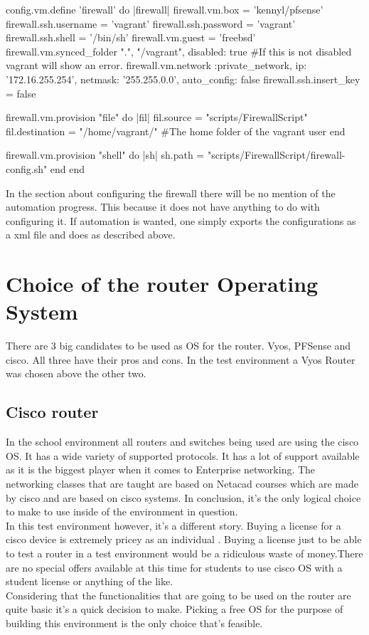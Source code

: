 \begin{cisco}[title=PFSense automation in the vagrantfile]
  config.vm.define 'firewall' do |firewall|
    firewall.vm.box = 'kennyl/pfsense'
    firewall.ssh.username = 'vagrant'
    firewall.ssh.password = 'vagrant'
    firewall.ssh.shell = '/bin/sh'
    firewall.vm.guest = 'freebsd'
    firewall.vm.synced_folder ".", "/vagrant", disabled: true #If this is not disabled vagrant will show an error.
    firewall.vm.network :private_network,
      ip: '172.16.255.254',
      netmask: '255.255.0.0',
      auto_config: false
    firewall.ssh.insert_key = false

    firewall.vm.provision "file" do |fil|
      fil.source = "scripts/FirewallScript"
      fil.destination = "/home/vagrant/" #The home folder of the vagrant user
    end

    firewall.vm.provision "shell" do |sh|
      sh.path = "scripts/FirewallScript/firewall-config.sh"
    end
  end
\end{cisco}
In the section about configuring the firewall there will be no mention of the automation progress. This because it does not have anything to do with configuring it. If automation is wanted, one simply exports the configurations as a xml file and does as described above.
\section{ Choice of the router Operating System }
There are 3 big candidates to be used as OS for the router. Vyos, PFSense and cisco. All three have their pros and cons. In the test environment a Vyos Router was chosen above the other two.
\subsection{ Cisco router}
In the school environment all routers and switches being used are using the cisco OS. It has a wide variety of supported protocols. It has a lot of support available as it is the biggest player when it comes to Enterprise networking. The networking classes that are taught are based on Netacad courses which are made by cisco and are based on cisco systems. In conclusion, it's the only logical choice to make to use inside of the environment in question. \\
In this test environment however, it's a different story. Buying a license for a cisco device is extremely pricey as an individual . Buying a license just to be able to test a router in a test environment would be a ridiculous waste of money.There are no special offers available at this time for students to use cisco OS with a student license or anything of the like. \\
Considering that the functionalities that are going to be used on the router are quite basic it's a quick decision to make. Picking a free OS for the purpose of building this environment is the only choice that's feasible.
